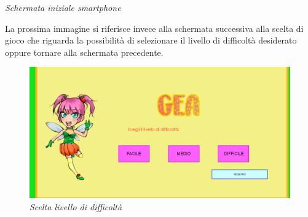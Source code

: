 \begin{center}
\begin{minipage}[c]{.40\textwidth}
\vspace{10px}
\emph{Schermata iniziale smartphone}\bigskip
\end{minipage}
\end{center}

La prossima immagine si riferisce invece alla schermata successiva alla scelta di gioco che riguarda la possibilità di selezionare il livello di difficoltà desiderato oppure tornare alla schermata precedente.
\begin{figure}[htbp]
\centering
\includegraphics[width=.70\textwidth]{Images/Design/Level}\\
\vspace{10px}
\emph{Scelta livello di difficoltà}\bigskip
\end{figure}

